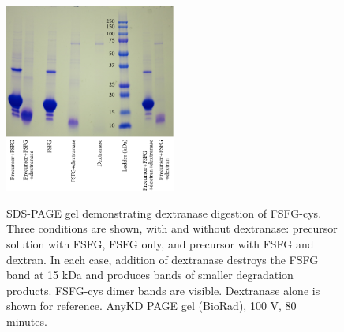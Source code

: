 \begin{figure} %
\caption[Dextranase degradation of FSFG.]{SDS-PAGE gel demonstrating dextranase digestion of FSFG-cys.  Three conditions are shown, with and without dextranase: precursor solution with FSFG, FSFG only, and precursor with FSFG and dextran.  In each case, addition of dextranase destroys the FSFG band at 15 kDa and produces bands of smaller degradation products.  FSFG-cys dimer bands are visible.  Dextranase alone is shown for reference.  AnyKD PAGE gel (BioRad), 100 V, 80 minutes.\\}
\centering
\includegraphics[width=0.5\textwidth]{figs/ch03/FSFG+dxase_PAGE}
\label{fig:dxase-FSFG}
\end{figure}

